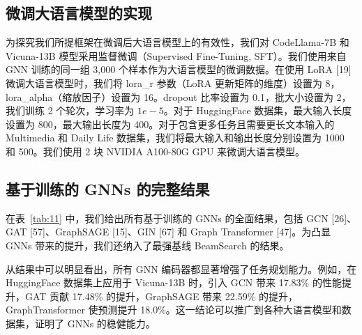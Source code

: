 \documentclass[11pt,UTF8,fontset=fandol]{ctexart}
\begin{document}
\subsection{微调大语言模型的实现}

为探究我们所提框架在微调后大语言模型上的有效性，我们对 CodeLlama-7B 和 Vicuna-13B 模型采用监督微调（Supervised Fine-Tuning, SFT）。我们使用来自 GNN 训练的同一组 3{,}000 个样本作为大语言模型的微调数据。在使用 LoRA [19] 微调大语言模型时，我们将 lora\_r 参数（LoRA 更新矩阵的维度）设置为 8，lora\_alpha（缩放因子）设置为 16。dropout 比率设置为 0.1，批大小设置为 2，我们训练 2 个轮次，学习率为 $1e-5$。对于 HuggingFace 数据集，最大输入长度设置为 800，最大输出长度为 400。对于包含更多任务且需要更长文本输入的 Multimedia 和 Daily Life 数据集，我们将最大输入和输出长度分别设置为 1000 和 500。我们使用 2 块 NVIDIA A100-80G GPU 来微调大语言模型。

\subsection{基于训练的 GNNs 的完整结果}

在表~\ref{tab:11} 中，我们给出所有基于训练的 GNNs 的全面结果，包括 GCN [26]、GAT [57]、GraphSAGE [15]、GIN [67] 和 Graph Transformer [47]。为凸显 GNNs 带来的提升，我们还纳入了最强基线 BeamSearch 的结果。

从结果中可以明显看出，所有 GNN 编码器都显著增强了任务规划能力。例如，在 HuggingFace 数据集上应用于 Vicuna-13B 时，引入 GCN 带来 17.83\% 的性能提升，GAT 贡献 17.48\% 的提升，GraphSAGE 带来 22.59\% 的提升，GraphTransformer 使预测提升 18.0\%。这一结论可以推广到各种大语言模型和数据集，证明了 GNNs 的稳健能力。
\end{document}
